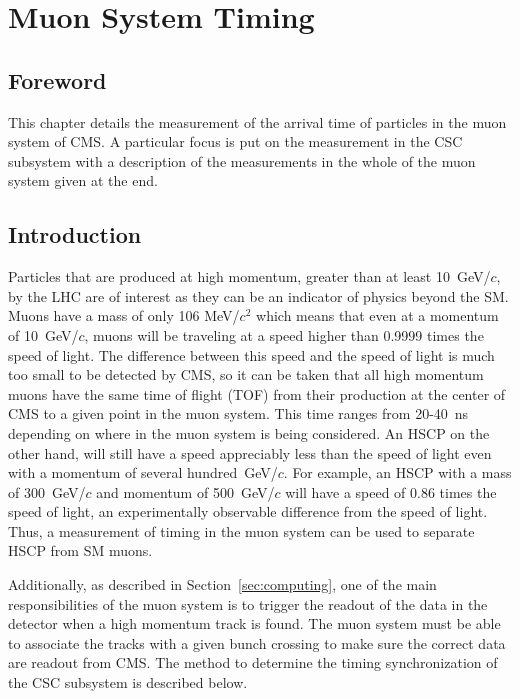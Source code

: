 \chapter{Muon System Timing \label{sec:timing}}

\section{Foreword}
This chapter details the measurement of the arrival time of particles in the muon system of CMS. A particular focus is put on the measurement in the CSC subsystem
with a description of the measurements in the whole of the muon system given at the end. 

\section{Introduction \label{sec:timingintro}}
Particles that are produced at high momentum, greater than at least 10~GeV/$c$, by the LHC are of interest as they can be an indicator of physics
beyond the SM. Muons have a mass of only 106 MeV/$c^2$ which means that even at a momentum of 10~GeV/$c$, muons will be traveling at a speed higher than 0.9999
times the speed of light. The difference between this speed and the speed of light is much too small to be detected by CMS, so it can be
taken that all high momentum muons have the same time of flight (TOF) from their production at the center of CMS to a given point in the muon system.
This time ranges from 20-40~ns depending on where in the muon system is being considered. An HSCP on the other hand, will still have a speed appreciably less than the speed
of light even with a momentum of several hundred~GeV/$c$. For example, an HSCP with a mass of 300~GeV/$c$ and momentum of 500~GeV/$c$ will have a speed of
0.86 times the speed of light, an experimentally observable difference from the speed of light.
Thus, a measurement of timing in the muon system can be used to separate HSCP from SM muons.

Additionally, as described in Section~\ref{sec:computing}, one of the main responsibilities  of the muon system is to trigger the readout of the data in the detector
when a high momentum track is found. The muon system must be able to associate the tracks with a given bunch crossing to make sure the correct data are readout from CMS.
The method to determine the timing synchronization of the CSC subsystem is described below.

